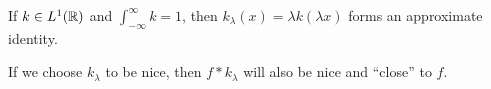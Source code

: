 \begin{exercise}
  If $k \in L^1(\mathbb{R})$ and
  $\displaystyle \int_{-\infty}^\infty k = 1$, then
  $k_\lambda(x) = \lambda k(\lambda x)$
  forms an approximate identity.
\end{exercise}

\begin{remark}
  If we choose $k_{\lambda}$ to be nice,
  then $f * k_\lambda$ will also be nice and
  ``close'' to $f$.
\end{remark}
